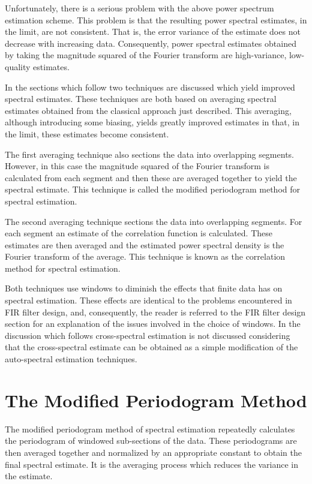 	Unfortunately, there is a serious problem with the 
above power spectrum estimation scheme.  This problem is that the 
resulting power spectral estimates, in the limit, are
not consistent.  That is, the error variance
of the estimate does not decrease with increasing data.
Consequently, power spectral estimates obtained
by taking the magnitude squared of the Fourier transform
are high-variance, low-quality estimates.

	In the sections which follow two
techniques are discussed which yield improved
spectral estimates.  These techniques are both based on averaging
spectral estimates obtained
from the classical approach just described.  This
averaging, although introducing some biasing,
yields greatly improved estimates in that, in the
limit, these estimates become consistent.

	The first averaging technique also sections
the data into overlapping segments.  However, in this
case the magnitude squared of the Fourier
transform is calculated from each segment and then these
are averaged together to yield the spectral estimate.
This technique is called the modified periodogram
method for spectral estimation.

	The second averaging technique sections the data
into overlapping segments.  For each segment an estimate of
the correlation function is calculated.  These estimates are
then averaged and the estimated power spectral density
is the Fourier transform of the average.  This technique is known
as the correlation method for spectral estimation.

	Both techniques use windows
to diminish the effects that finite data has on spectral estimation.
These effects are identical to the problems encountered in
FIR filter design, and, consequently, the reader is referred to
the FIR filter design section for an explanation of the
issues involved in the choice of windows.  In the discussion
which follows cross-spectral estimation is not discussed considering
that the cross-spectral estimate can be obtained as a simple
modification of the auto-spectral estimation techniques.

\section{The Modified Periodogram Method}

	The modified periodogram method of spectral estimation
repeatedly calculates the periodogram of windowed sub-sections of the data.
These periodograms are then averaged together and normalized by
an appropriate constant to obtain the final spectral estimate.
It is the averaging process which reduces the variance in the
estimate.

